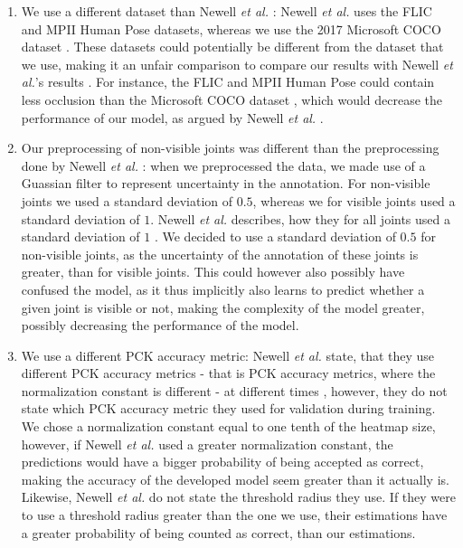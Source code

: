 \documentclass[./main.tex]{subfiles}
\begin{document}
\begin{enumerate}
    \item We use a different dataset than Newell \textit{et al.} \cite{Newell}: Newell \textit{et al.} uses the FLIC \cite{FLIC} and MPII Human Pose \cite{MPII} datasets, whereas we use the 2017 Microsoft COCO dataset \cite{COCO_article}. These datasets could potentially be different from the dataset that we use, making it an unfair comparison to compare our results with Newell \textit{et al.}'s results \cite{Newell}. For instance, the FLIC \cite{FLIC} and MPII Human Pose \cite{MPII} could contain less occlusion than the Microsoft COCO dataset \cite{COCO_article}, which would decrease the performance of our model, as argued by Newell \textit{et al.} \cite{Newell}.
    \item Our preprocessing of non-visible joints was different than the preprocessing done by Newell \textit{et al.} \cite{Newell}: when we preprocessed the data, we made use of a Guassian filter to represent uncertainty in the annotation. For non-visible joints we used a standard deviation of $0.5$, whereas we for visible joints used a standard deviation of $1$. Newell \textit{et al.} describes, how they for all joints used a standard deviation of $1$ \cite{Newell}. We decided to use a standard deviation of $0.5$ for non-visible joints, as the uncertainty of the annotation of these joints is greater, than for visible joints. This could however also possibly have confused the model, as it thus implicitly also learns to predict whether a given joint is visible or not, making the complexity of the model greater, possibly decreasing the performance of the model.
    \item We use a different PCK accuracy metric: Newell \textit{et al.} state, that they use different PCK accuracy metrics - that is PCK accuracy metrics, where the normalization constant is different - at different times \cite{Newell}, however, they do not state which PCK accuracy metric they used for validation during training. We chose a normalization constant equal to one tenth of the heatmap size, however, if Newell \textit{et al.} \cite{Newell} used a greater normalization constant, the predictions would have a bigger probability of being accepted as correct, making the accuracy of the developed model seem greater than it actually is. Likewise, Newell \textit{et al.} \cite{Newell} do not state the threshold radius they use. If they were to use a threshold radius greater than the one we use, their estimations have a greater probability of being counted as correct, than our estimations.

\end{enumerate}
\end{document}
